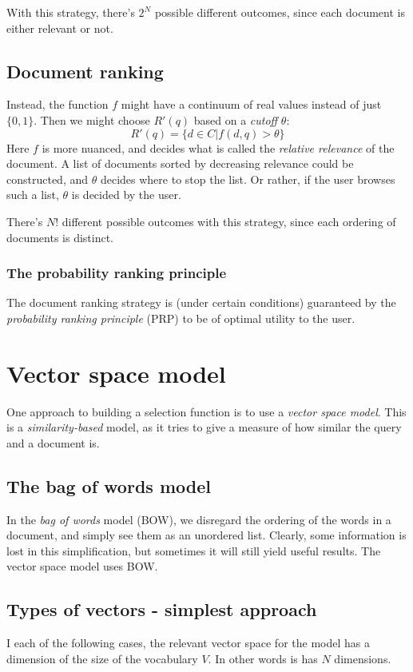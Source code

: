 \documentclass[12pt, a4paper]{article}
\numberwithin{equation}{section}
\begin{document}
With this strategy, there's $2^N$ possible different outcomes, since each document is either relevant or not.

\subsection{Document ranking}
Instead, the function $f$ might have a continuum of real values instead of just $\{0, 1\}$. Then we might choose $R'(q)$ based on a \textit{cutoff} $\theta$:
\begin{equation}
R'(q)=\{d\in C|f(d,q)>\theta\}
\end{equation}
Here $f$ is more nuanced, and decides what is called the \textit{relative relevance} of the document. A list of documents sorted by decreasing relevance could be constructed, and $\theta$ decides where to stop the list. Or rather, if the user browses such a list, $\theta$ is decided by the user.

There's $N!$ different possible outcomes with this strategy, since each ordering of documents is distinct.

\subsubsection{The probability ranking principle}
The document ranking strategy is (under certain conditions) guaranteed by the \textit{probability ranking principle} (PRP) to be of optimal utility to the user.

\section{Vector space model}
One approach to building a selection function is to use a \textit{vector space model}. This is a \textit{similarity-based} model, as it tries to give a measure of how similar the query and a document is.

\subsection{The bag of words model}
In the \textit{bag of words} model (BOW), we disregard the ordering of the words in a document, and simply see them as an unordered list. Clearly, some information is lost in this simplification, but sometimes it will still yield useful results. The vector space model uses BOW.

\subsection{Types of vectors - simplest approach}
I each of the following cases, the relevant vector space for the model has a dimension of the size of the vocabulary $V$. In other words is has $N$ dimensions.
\end{document}
